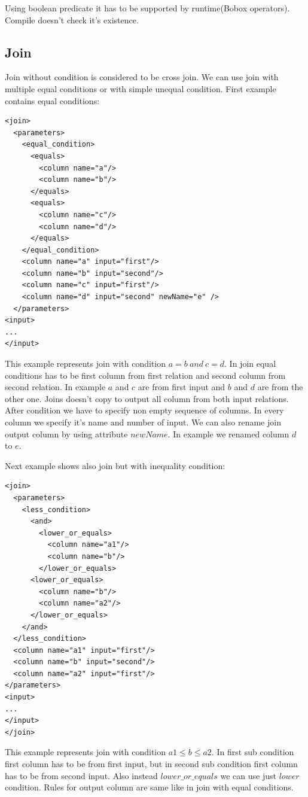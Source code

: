 Using boolean predicate it has to be supported by runtime(Bobox operators). Compile doesn't check it's existence.

\subsection{Join}

Join without condition is considered to be cross join. We can use join with multiple equal conditions or with simple unequal condition. First example contains equal conditions:

\begin{lstlisting}
<join>
  <parameters>
    <equal_condition>
      <equals>
        <column name="a"/>
        <column name="b"/>
      </equals>
      <equals>
        <column name="c"/>
        <column name="d"/>
      </equals>
    </equal_condition>
    <column name="a" input="first"/>
    <column name="b" input="second"/>
    <column name="c" input="first"/>
    <column name="d" input="second" newName="e" />
  </parameters>
<input>
...
</input>
\end{lstlisting}

This example represents join with condition $a=b~and~c=d$. In join equal conditions has to be first column from first relation and second column from second relation. In example $a$ and $c$ are from first input and $b$ and $d$ are from the other one. Joins doesn't copy to output all column from both input relations. After condition we have to specify non empty sequence of columns. In every column we specify it's name and number of input. We can also rename join output column by using attribute $newName$. In example we renamed column $d$ to $e$.

Next example shows also join but with inequality condition:

\begin{lstlisting}
<join>
  <parameters>
    <less_condition>
      <and>
        <lower_or_equals>
          <column name="a1"/>
          <column name="b"/>
        </lower_or_equals>
      <lower_or_equals>
        <column name="b"/>
        <column name="a2"/>
      </lower_or_equals>
    </and>
  </less_condition>
  <column name="a1" input="first"/>
  <column name="b" input="second"/>
  <column name="a2" input="first"/>
</parameters>
<input>
...
</input>
</join>
\end{lstlisting}
This example represents join with condition $a1\leq b\leq a2$. In first sub condition first column has to be from first input, but in second sub condition first column has to be from second input. Also instead $lower\_or\_equals$ we can use just $lower$ condition. Rules for output column are same like in join with equal conditions.

